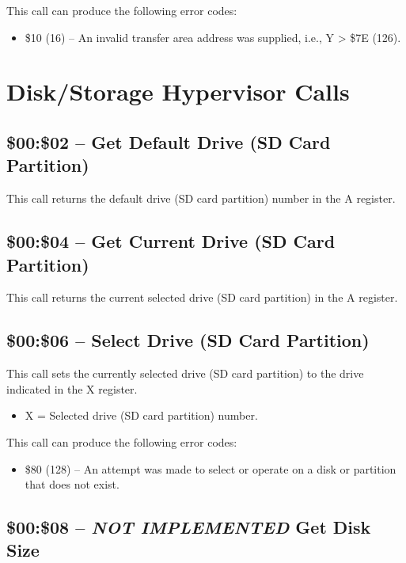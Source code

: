 This call can produce the following error codes:

\begin{itemize}
\item \$10 (16) -- An invalid transfer area address was supplied, i.e., Y > \$7E (126).
\end{itemize}

\section{Disk/Storage Hypervisor Calls}

\subsection{\$00:\$02 -- Get Default Drive (SD Card Partition)}

This call returns the default drive (SD card partition) number in the A register.

\subsection{\$00:\$04 -- Get Current Drive (SD Card Partition)}

This call returns the current selected drive (SD card partition) in the A register.

\subsection{\$00:\$06 -- Select Drive (SD Card Partition)}

This call sets the currently selected drive (SD card partition) to the drive indicated in the X register.

\begin{itemize}
  \item X = Selected drive (SD card partition) number.
\end{itemize}

This call can produce the following error codes:

\begin{itemize}
\item \$80 (128) -- An attempt was made to select or operate on a disk or partition that does not exist.
\end{itemize}

\subsection{\$00:\$08 -- {\em NOT IMPLEMENTED} Get Disk Size}

